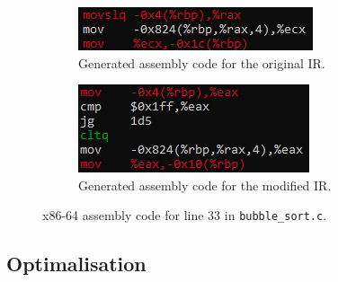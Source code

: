 \documentclass{article}
\begin{document}
	\begin{figure}
		\centering
		\begin{subfigure}{0.48\textwidth}
			\includegraphics[width=\linewidth]{fig_machine_code}
			\caption{Generated assembly code for the original IR.}
			\label{fig:machine_code}
		\end{subfigure}
		\begin{subfigure}{0.48\textwidth}
			\includegraphics[width=\linewidth]{fig_machine_code_checked}
			\caption{Generated assembly code for the modified IR.}
			\label{fig_machine_code_checked}
		\end{subfigure}
		\caption{x86-64 assembly code for line 33 in \texttt{bubble\_sort.c}.}
	\end{figure}
	
	
	\subsection{Optimalisation}
\end{document}
